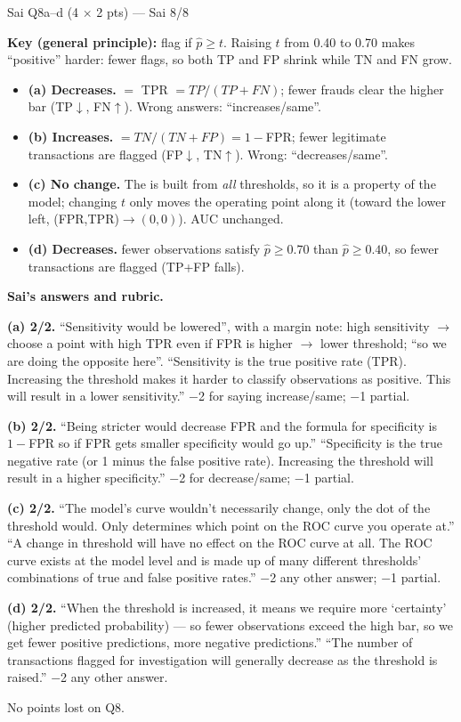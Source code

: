 \begin{qbox}{Sai Q8a--d (4 $\times$ 2 pts) --- Sai 8/8}
\par\textbf{Key (general principle):} flag if $\hat p\ge t$. Raising $t$ from 0.40 to 0.70 makes ``positive'' harder: fewer flags, so both TP and FP shrink while TN and FN grow. 
\begin{itemize}[leftmargin=1em,itemsep=0pt]
\item \textbf{(a) Decreases.}  $=$ TPR $=TP/(TP+FN)$; fewer frauds clear the higher bar (TP$\downarrow$, FN$\uparrow$). Wrong answers: ``increases/same''.
\item \textbf{(b) Increases.}  $=TN/(TN+FP)=1-$FPR; fewer legitimate transactions are flagged (FP$\downarrow$, TN$\uparrow$). Wrong: ``decreases/same''.
\item \textbf{(c) No change.} The  is built from \emph{all} thresholds, so it is a property of the model; changing $t$ only moves the operating point along it (toward the lower left, (FPR,TPR)$\to(0,0)$). AUC unchanged. 
\item \textbf{(d) Decreases.} fewer observations satisfy $\hat p\ge 0.70$ than $\hat p\ge 0.40$, so fewer transactions are flagged (TP+FP falls).
\end{itemize}
\par\textbf{Sai's answers and rubric.}
\par\textbf{(a) 2/2.} ``Sensitivity would be lowered'', with a margin note: high sensitivity $\to$ choose a point with high TPR even if FPR is higher $\to$ lower threshold; ``so we are doing the opposite here''. \grader ``Sensitivity is the true positive rate (TPR). Increasing the threshold makes it harder to classify observations as positive. This will result in a lower sensitivity.'' $-$2 for saying increase/same; $-$1 partial.
\par\textbf{(b) 2/2.} ``Being stricter would decrease FPR and the formula for specificity is $1-$FPR so if FPR gets smaller specificity would go up.'' \grader ``Specificity is the true negative rate (or 1 minus the false positive rate). Increasing the threshold will result in a higher specificity.'' $-$2 for decrease/same; $-$1 partial.
\par\textbf{(c) 2/2.} ``The model's curve wouldn't necessarily change, only the dot of the threshold would. Only determines which point on the ROC curve you operate at.'' \grader ``A change in threshold will have no effect on the ROC curve at all. The ROC curve exists at the model level and is made up of many different thresholds' combinations of true and false positive rates.'' $-$2 any other answer; $-$1 partial.
\par\textbf{(d) 2/2.} ``When the threshold is increased, it means we require more `certainty' (higher predicted probability) --- so fewer observations exceed the high bar, so we get fewer positive predictions, more negative predictions.'' \grader ``The number of transactions flagged for investigation will generally decrease as the threshold is raised.'' $-$2 any other answer.
\par No points lost on Q8.
\end{qbox}


